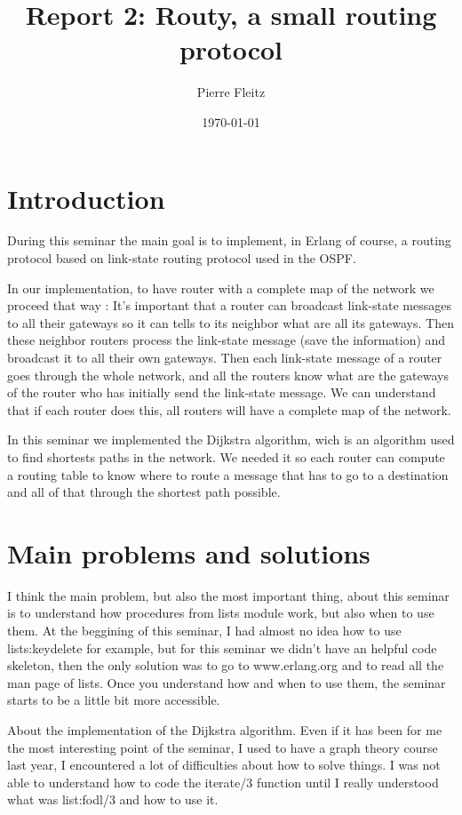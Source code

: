 \documentclass[a4paper, 11pt]{article}
\title{Report 2: Routy, a small routing protocol}
\author{Pierre Fleitz}
\date{\today{}}
\begin{document}
\maketitle

\section{Introduction}

During this seminar the main goal is to implement, in Erlang of course, a routing protocol based on link-state routing protocol used in the OSPF.

In our implementation, to have router with a complete map of the network we proceed that way : It's important that a router can broadcast link-state messages to all their gateways so it can tells to its neighbor what are all its gateways. Then these neighbor routers process the link-state message (save the information) and broadcast it to all their own gateways. Then each link-state message of a router goes through the whole network, and all the routers know what are the gateways of the router who has initially send the link-state message. We can understand that if each router does this, all routers will have a complete map of the network.

In this seminar we implemented the Dijkstra algorithm, wich is an algorithm used to find shortests paths in the network. We needed it so each router can compute a routing table to know where to route a message that has to go to a destination and all of that through the shortest path possible.

\section{Main problems and solutions}

I think the main problem, but also the most important thing, about this seminar is to understand how procedures from lists module work, but also when to use them. At the beggining of this seminar, I had almost no idea how to use lists:keydelete for example, but for this seminar we didn't have an helpful code skeleton, then the only solution was to go to www.erlang.org and to read all the man page of lists. Once you understand how and when to use them, the seminar starts to be a little bit more accessible. 

About the implementation of the Dijkstra algorithm.
Even if it has been for me the most interesting point of the seminar, I used to have a graph theory course last year, I encountered a lot of difficulties about how to solve things. I was not able to understand how to code the iterate/3 function until I really understood what was list:fodl/3 and how to use it.
\end{document}
